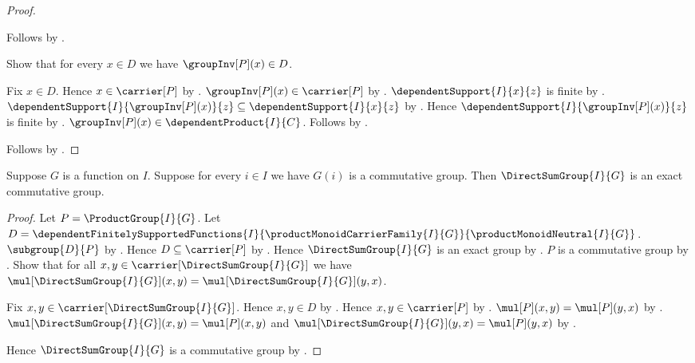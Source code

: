 \begin{proof}
\begin{subproof}
        Follows by .
    \end{subproof}
    Show that for every $x\in D$ we have $\groupInv[P](x)\in D$.
    \begin{subproof}
        Fix $x\in D$.
        Hence $x\in\carrier[P]$ by .
        $\groupInv[P](x)\in\carrier[P]$ by
            .
        $\dependentSupport{I}{x}{z}$ is finite by
            .
        $\dependentSupport{I}{\groupInv[P](x)}{z}
            \subseteq\dependentSupport{I}{x}{z}$ by
            .
        Hence $\dependentSupport{I}{\groupInv[P](x)}{z}$ is finite by
            .
        $\groupInv[P](x)\in\dependentProduct{I}{C}$.
        Follows by .
    \end{subproof}
    Follows by .
\end{proof}

\begin{theorem}\label{direct_sum_group_is_exact}
    Suppose $G$ is a function on $I$.
    Suppose for every $i\in I$ we have $G(i)$ is a commutative group.
    Then $\DirectSumGroup{I}{G}$ is an exact commutative group.
\end{theorem}
\begin{proof}
    Let $P=\ProductGroup{I}{G}$.
    Let $D=\dependentFinitelySupportedFunctions
        {I}{\productMonoidCarrierFamily{I}{G}}{
            \productMonoidNeutral{I}{G}}$.
    $\subgroup{D}{P}$ by .
    Hence $D\subseteq\carrier[P]$ by .
    Hence $\DirectSumGroup{I}{G}$ is an exact group by
        .
    $P$ is a commutative group by
        .
    Show that for all $x,y\in\carrier[\DirectSumGroup{I}{G}]$ we have
        $\mul[\DirectSumGroup{I}{G}](x,y)
            =\mul[\DirectSumGroup{I}{G}](y,x)$.
    \begin{subproof}
        Fix $x,y\in\carrier[\DirectSumGroup{I}{G}]$.
        Hence $x,y\in D$ by .
        Hence $x,y\in\carrier[P]$ by .
        $\mul[P](x,y)=\mul[P](y,x)$ by
            .
        $\mul[\DirectSumGroup{I}{G}](x,y)=\mul[P](x,y)$ and
            $\mul[\DirectSumGroup{I}{G}](y,x)=\mul[P](y,x)$ by
            .
    \end{subproof}
    Hence $\DirectSumGroup{I}{G}$ is a commutative group by
        .
\end{proof}

